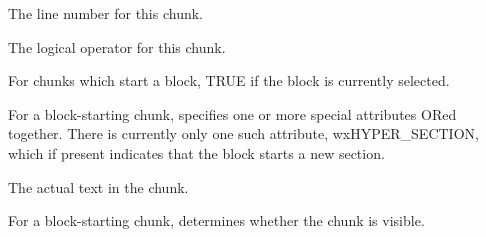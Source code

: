 

The line number for this chunk.



The logical operator for this chunk.



For chunks which start a block, TRUE if the block is currently selected.



For a block-starting chunk, specifies one or more special attributes ORed together.
There is currently only one such attribute, wxHYPER\_SECTION, which
if present indicates that the block starts a new section.



The actual text in the chunk.



For a block-starting chunk, determines whether the chunk is visible.

